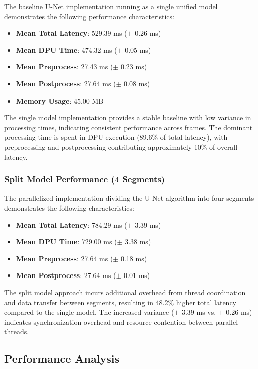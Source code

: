 The baseline U-Net implementation running as a single unified model demonstrates the following performance characteristics:

\begin{itemize}
\item \textbf{Mean Total Latency}: 529.39 ms ($\pm$ 0.26 ms)
\item \textbf{Mean DPU Time}: 474.32 ms ($\pm$ 0.05 ms)
\item \textbf{Mean Preprocess}: 27.43 ms ($\pm$ 0.23 ms)
\item \textbf{Mean Postprocess}: 27.64 ms ($\pm$ 0.08 ms)
\item \textbf{Memory Usage}: 45.00 MB
\end{itemize}

The single model implementation provides a stable baseline with low variance in processing times, indicating consistent performance across frames. The dominant processing time is spent in DPU execution (89.6\% of total latency), with preprocessing and postprocessing contributing approximately 10\% of overall latency.

\subsubsection{Split Model Performance (4 Segments)}\label{subsubsec:split-model-performance}

The parallelized implementation dividing the U-Net algorithm into four segments demonstrates the following characteristics:

\begin{itemize}
\item \textbf{Mean Total Latency}: 784.29 ms ($\pm$ 3.39 ms)
\item \textbf{Mean DPU Time}: 729.00 ms ($\pm$ 3.38 ms)
\item \textbf{Mean Preprocess}: 27.64 ms ($\pm$ 0.18 ms)
\item \textbf{Mean Postprocess}: 27.64 ms ($\pm$ 0.01 ms)
\end{itemize}

The split model approach incurs additional overhead from thread coordination and data transfer between segments, resulting in 48.2\% higher total latency compared to the single model. The increased variance ($\pm$ 3.39 ms vs. $\pm$ 0.26 ms) indicates synchronization overhead and resource contention between parallel threads.

\subsection{Performance Analysis}\label{subsec:performance-analysis}

